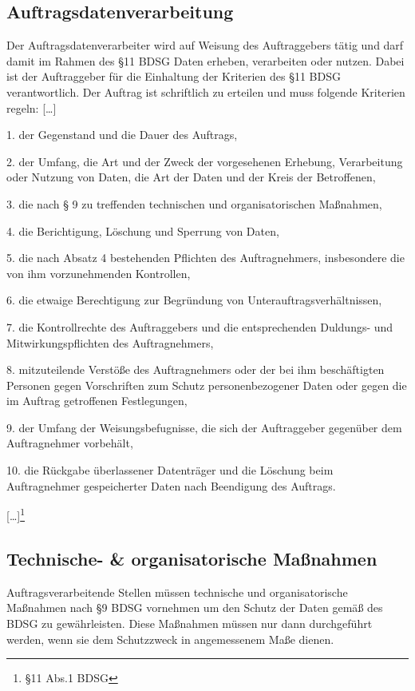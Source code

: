 \subsection{Auftragsdatenverarbeitung}
Der Auftragsdatenverarbeiter wird auf Weisung des Auftraggebers t\"atig und darf damit im Rahmen des §11 BDSG Daten erheben, verarbeiten oder nutzen. Dabei ist der Auftraggeber f\"ur die Einhaltung der Kriterien des §11 BDSG verantwortlich. Der Auftrag ist schriftlich zu erteilen und muss folgende Kriterien regeln:{\glqq} […]
 \begin{seList}                            

\item 1. der Gegenstand und die Dauer des Auftrags,
\item 2. der Umfang, die Art und der Zweck der vorgesehenen Erhebung, Verarbeitung oder Nutzung von Daten, die Art der Daten und der Kreis der Betroffenen,
\item 3. die nach § 9 zu treffenden technischen und organisatorischen Ma{\ss}nahmen,
\item 4. die Berichtigung, L\"oschung und Sperrung von Daten,
\item 5. die nach Absatz 4 bestehenden Pflichten des Auftragnehmers, insbesondere die von ihm vorzunehmenden Kontrollen,
\item 6. die etwaige Berechtigung zur Begr\"undung von Unterauftragsverh\"altnissen,
\item 7. die Kontrollrechte des Auftraggebers und die entsprechenden Duldungs- und Mitwirkungspflichten des Auftragnehmers,
\item 8. mitzuteilende Verst\"o{\ss}e des Auftragnehmers oder der bei ihm besch\"aftigten Personen gegen Vorschriften zum Schutz personenbezogener Daten oder gegen die im Auftrag getroffenen Festlegungen,
\item 9. der Umfang der Weisungsbefugnisse, die sich der Auftraggeber gegen\"uber dem Auftragnehmer vorbeh\"alt,
\item 10. die R\"uckgabe \"uberlassener Datentr\"ager und die L\"oschung beim Auftragnehmer gespeicherter Daten nach Beendigung des Auftrags. 
\end{seList}

[…]{\grqq}\footnote{§11 Abs.1 BDSG}
 \label{auftragsdatenverarbeitung}
\subsection{Technische- \& organisatorische Ma{\ss}nahmen}
Auftragsverarbeitende Stellen m\"ussen technische und organisatorische Ma{\ss}nahmen nach §9 BDSG vornehmen um den Schutz der Daten gem\"a{\ss} des BDSG zu gew\"ahrleisten. Diese Ma{\ss}nahmen m\"ussen nur dann durchgef\"uhrt werden, wenn sie dem Schutzzweck in angemessenem Ma{\ss}e dienen.\newline

